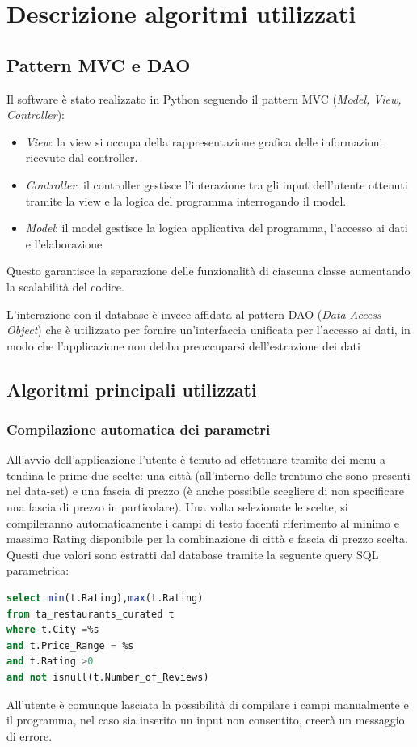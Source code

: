 \documentclass{report}
\begin{document}
\chapter{Descrizione algoritmi utilizzati}\label{cap_algoritmi}

\section{Pattern MVC e DAO}\label{sec_MVC}
Il software è stato realizzato in Python seguendo il pattern MVC (\textit{Model, View, Controller}): 
\begin{itemize}
    \item \textit{View}: la view si occupa della rappresentazione grafica delle informazioni ricevute dal controller.
    \item \textit{Controller}: il controller gestisce l'interazione tra gli input dell'utente ottenuti tramite la view e la logica del programma interrogando il model.
    \item \textit{Model}: il model gestisce la logica applicativa del programma, l'accesso ai dati e l'elaborazione 
\end{itemize}
Questo garantisce la separazione delle funzionalità di ciascuna classe aumentando la scalabilità del codice.

L'interazione con il database è invece affidata al pattern DAO (\textit{Data Access Object}) che è utilizzato per fornire un'interfaccia unificata per l'accesso ai dati, in modo che l'applicazione non debba preoccuparsi dell'estrazione dei dati

\section{Algoritmi principali utilizzati}\label{sec_algoritmi}

\subsection{Compilazione automatica dei parametri}\label{sec2_parametri}
All'avvio dell'applicazione l'utente è tenuto ad effettuare tramite dei menu a tendina le prime due scelte: una città (all'interno delle trentuno che sono presenti nel data-set) e una fascia di prezzo (è anche possibile scegliere di non specificare una fascia di prezzo in particolare). Una volta selezionate le scelte, si compileranno automaticamente i campi di testo facenti riferimento al minimo e massimo Rating disponibile per la combinazione di città e fascia di prezzo scelta. Questi due valori sono estratti dal database tramite la seguente query SQL parametrica:
\begin{lstlisting}[language=SQL, caption={Query SQL per estrarre il minimo e massimo Rating}]
select min(t.Rating),max(t.Rating)
from ta_restaurants_curated t
where t.City =%s
and t.Price_Range = %s
and t.Rating >0
and not isnull(t.Number_of_Reviews)    
\end{lstlisting}
All'utente è comunque lasciata la possibilità di compilare i campi manualmente e il programma, nel caso sia inserito un input non consentito, creerà un messaggio di errore.
\end{document}
